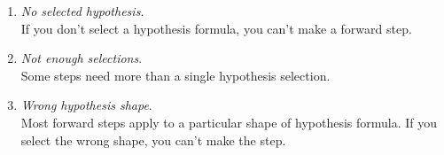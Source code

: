 \documentclass[11pt]{book}
\begin{document}
\begin{enumerate}
\item \emph{No selected hypothesis}. \\
If you don't select a hypothesis formula, you can't make a forward step.

\item \emph{Not enough selections}.\\
Some steps need more than a single hypothesis selection. 

\item \emph{Wrong hypothesis shape}.\\
Most forward steps apply to a particular shape of hypothesis formula. If you select the wrong shape, you can't make the step.

\begin{figure}
\centering
{}
\qquad
{}
\end{figure}
\end{enumerate}
\end{document}
